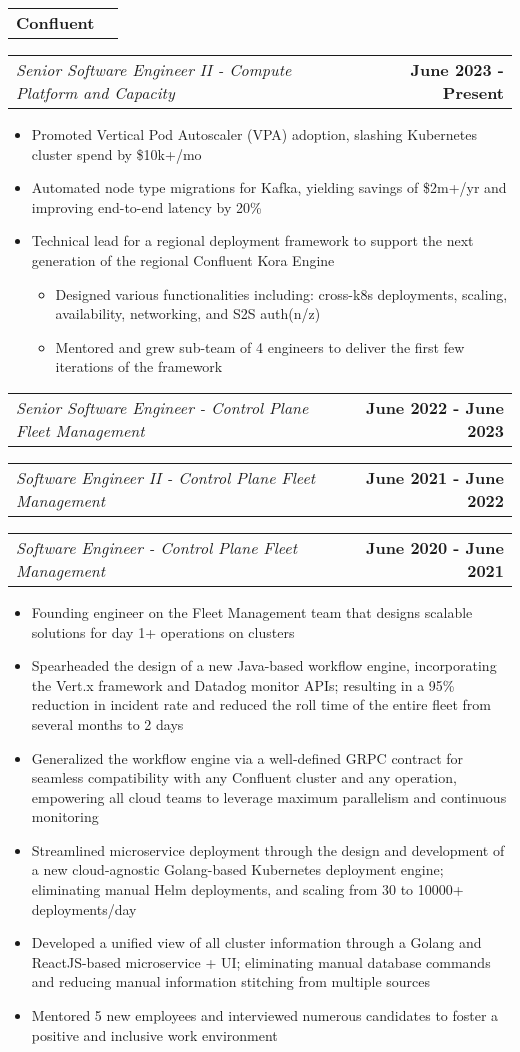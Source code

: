 \documentclass[letterpaper,10.8pt]{article}
\makeatletter
\newcommand{\resumeItemOne}[1]{
  \item[$\circ$]\small{{#1 \vspace{-2pt}}
  }
}
\newcommand{\resumeSubheadingCompanyOnly}[1]{
  \vspace{-2pt}\item[$ $]
    \begin{tabular*}{0.97\textwidth}{l@{\extracolsep{\fill}}r}
      \textbf{#1} \\
    \end{tabular*}
  \vspace{-7pt}
}
\newcommand{\resumeSubheadingTitleOnly}[2]{
  \vspace{-2pt}\item[$ $]
    \begin{tabular*}{0.97\textwidth}{l@{\extracolsep{\fill}}r}
      \textit{\small #1} & \textbf{\small #2} \\
    \end{tabular*}
  \vspace{-7pt}
}
\newcommand{\resumeItemListStart}{\begin{itemize}}
\newcommand{\resumeItemListEnd}{\end{itemize}\vspace{-5pt}}
\makeatother
\begin{document}
    \resumeSubheadingCompanyOnly {Confluent}
    \resumeSubheadingTitleOnly
    {Senior Software Engineer II - Compute Platform and Capacity}{June 2023 - Present}
    \resumeItemListStart
      \resumeItemOne{Promoted Vertical Pod Autoscaler (VPA) adoption, slashing Kubernetes cluster spend by \$10k+/mo}
      \resumeItemOne{Automated node type migrations for Kafka, yielding savings of \$2m+/yr and improving end-to-end latency by 20\%} 
      \resumeItemOne{Technical lead for a regional deployment framework to support the next generation of the regional Confluent Kora Engine}
      \resumeItemListStart
        \resumeItemOne{Designed various functionalities including: cross-k8s deployments, scaling, availability, networking, and S2S auth(n/z)}
        \resumeItemOne{Mentored and grew sub-team of 4 engineers to deliver the first few iterations of the framework}
      \resumeItemListEnd
    \resumeItemListEnd
    \resumeSubheadingTitleOnly
    {Senior Software Engineer - Control Plane Fleet Management}{June 2022 - June 2023}
    \resumeSubheadingTitleOnly
    {Software Engineer II - Control Plane Fleet Management}{June 2021 - June 2022}
    \resumeSubheadingTitleOnly
    {Software Engineer - Control Plane Fleet Management}{June 2020 - June 2021}
    \resumeItemListStart
      \resumeItemOne{Founding engineer on the Fleet Management team that designs scalable solutions for day 1+ operations on clusters}
      \resumeItemOne{Spearheaded the design of a new Java-based workflow engine, incorporating the Vert.x framework and Datadog monitor APIs; resulting in a 95\% reduction in incident rate and reduced the roll time of the entire fleet from several months to 2 days}
      \resumeItemOne{Generalized the workflow engine via a well-defined GRPC contract for seamless compatibility with any Confluent cluster and any operation, empowering all cloud teams to leverage maximum parallelism and continuous monitoring}
      \resumeItemOne{Streamlined microservice deployment through the design and development of a new cloud-agnostic Golang-based Kubernetes deployment engine; eliminating manual Helm deployments, and scaling from 30 to 10000+ deployments/day}
      \resumeItemOne{Developed a unified view of all cluster information through a Golang and ReactJS-based microservice + UI; eliminating manual database commands and reducing manual information stitching from multiple sources}
      \resumeItemOne{Mentored 5 new employees and interviewed numerous candidates to foster a positive and inclusive work environment}
  \resumeItemListEnd
\end{document}
